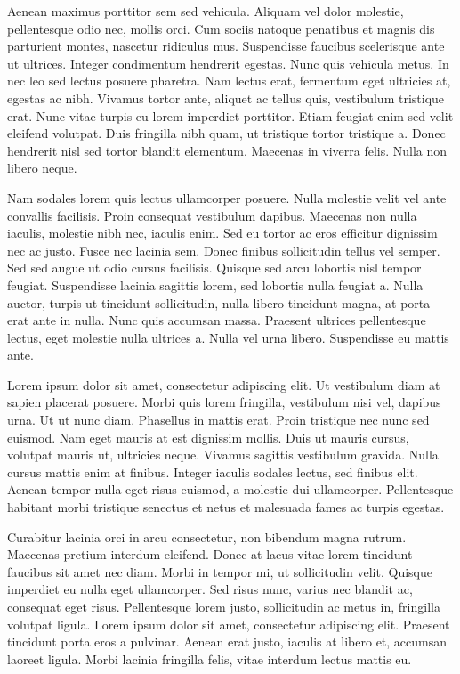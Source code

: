 Aenean maximus porttitor sem sed vehicula. Aliquam vel dolor molestie, pellentesque odio nec, mollis orci. Cum sociis natoque penatibus et magnis dis parturient montes, nascetur ridiculus mus. Suspendisse faucibus scelerisque ante ut ultrices. Integer condimentum hendrerit egestas. Nunc quis vehicula metus. In nec leo sed lectus posuere pharetra. Nam lectus erat, fermentum eget ultricies at, egestas ac nibh. Vivamus tortor ante, aliquet ac tellus quis, vestibulum tristique erat. Nunc vitae turpis eu lorem imperdiet porttitor. Etiam feugiat enim sed velit eleifend volutpat. Duis fringilla nibh quam, ut tristique tortor tristique a. Donec hendrerit nisl sed tortor blandit elementum. Maecenas in viverra felis. Nulla non libero neque.

Nam sodales lorem quis lectus ullamcorper posuere. Nulla molestie velit vel ante convallis facilisis. Proin consequat vestibulum dapibus. Maecenas non nulla iaculis, molestie nibh nec, iaculis enim. Sed eu tortor ac eros efficitur dignissim nec ac justo. Fusce nec lacinia sem. Donec finibus sollicitudin tellus vel semper. Sed sed augue ut odio cursus facilisis. Quisque sed arcu lobortis nisl tempor feugiat. Suspendisse lacinia sagittis lorem, sed lobortis nulla feugiat a. Nulla auctor, turpis ut tincidunt sollicitudin, nulla libero tincidunt magna, at porta erat ante in nulla. Nunc quis accumsan massa. Praesent ultrices pellentesque lectus, eget molestie nulla ultrices a. Nulla vel urna libero. Suspendisse eu mattis ante. 

Lorem ipsum dolor sit amet, consectetur adipiscing elit. Ut vestibulum diam at sapien placerat posuere. Morbi quis lorem fringilla, vestibulum nisi vel, dapibus urna. Ut ut nunc diam. Phasellus in mattis erat. Proin tristique nec nunc sed euismod. Nam eget mauris at est dignissim mollis. Duis ut mauris cursus, volutpat mauris ut, ultricies neque. Vivamus sagittis vestibulum gravida. Nulla cursus mattis enim at finibus. Integer iaculis sodales lectus, sed finibus elit. Aenean tempor nulla eget risus euismod, a molestie dui ullamcorper. Pellentesque habitant morbi tristique senectus et netus et malesuada fames ac turpis egestas.

Curabitur lacinia orci in arcu consectetur, non bibendum magna rutrum. Maecenas pretium interdum eleifend. Donec at lacus vitae lorem tincidunt faucibus sit amet nec diam. Morbi in tempor mi, ut sollicitudin velit. Quisque imperdiet eu nulla eget ullamcorper. Sed risus nunc, varius nec blandit ac, consequat eget risus. Pellentesque lorem justo, sollicitudin ac metus in, fringilla volutpat ligula. Lorem ipsum dolor sit amet, consectetur adipiscing elit. Praesent tincidunt porta eros a pulvinar. Aenean erat justo, iaculis at libero et, accumsan laoreet ligula. Morbi lacinia fringilla felis, vitae interdum lectus mattis eu.

